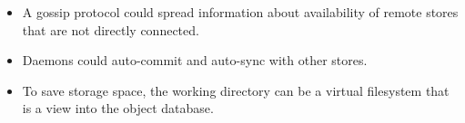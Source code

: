 \documentclass[12pt,a4paper,two-side]{book}
\begin{document}
\begin{itemize}

  \item A gossip protocol could spread information about availability of remote
    stores that are not directly connected.

  \item Daemons could auto-commit and auto-sync with other stores.

  \item To save storage space, the working directory can be a virtual filesystem
    that is a view into the object database.

\end{itemize}









\backmatter










\cleardoublepage
{}
{}



\end{document}
